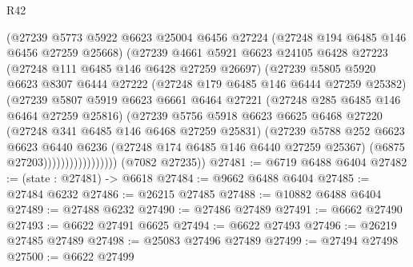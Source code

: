 \begin{lexlean}{R42}
\begin{coremodule}
{                          (@27239
                            @5773
                            @5922
                            @6623
                            @25004
                            @6456
                            @27224
                            (@27248 @194 @6485 @146 @6456 @27259 @25668)
                            (@27239
                              @4661
                              @5921
                              @6623
                              @24105
                              @6428
                              @27223
                              (@27248 @111 @6485 @146 @6428 @27259 @26697)
                              (@27239
                                @5805
                                @5920
                                @6623
                                @8307
                                @6444
                                @27222
                                (@27248 @179 @6485 @146 @6444 @27259 @25382)
                                (@27239
                                  @5807
                                  @5919
                                  @6623
                                  @6661
                                  @6464
                                  @27221
                                  (@27248 @285 @6485 @146 @6464 @27259 @25816)
                                  (@27239
                                    @5756
                                    @5918
                                    @6623
                                    @6625
                                    @6468
                                    @27220
                                    (@27248 @341 @6485 @146 @6468 @27259 @25831)
                                    (@27239
                                      @5788
                                      @252
                                      @6623
                                      @6623
                                      @6440
                                      @6236
                                      (@27248 @174 @6485 @146 @6440 @27259 @25367)
                                      (@6875 @27203)))))))))))))))))
      (@7082 @27235))
@27481 := @6719 @6488 @6404
@27482 := (state : @27481) -> @6618
@27484 := @9662 @6488 @6404
@27485 := @27484 @6232
@27486 := @26215 @27485
@27488 := @10882 @6488 @6404
@27489 := @27488 @6232
@27490 := @27486 @27489
@27491 := @6662 @27490
@27493 := @6622 @27491 @6625
@27494 := @6622 @27493
@27496 := @26219 @27485 @27489
@27498 := @25083 @27496 @27489
@27499 := @27494 @27498
@27500 := @6622 @27499
}
\end{coremodule}
\end{lexlean}
